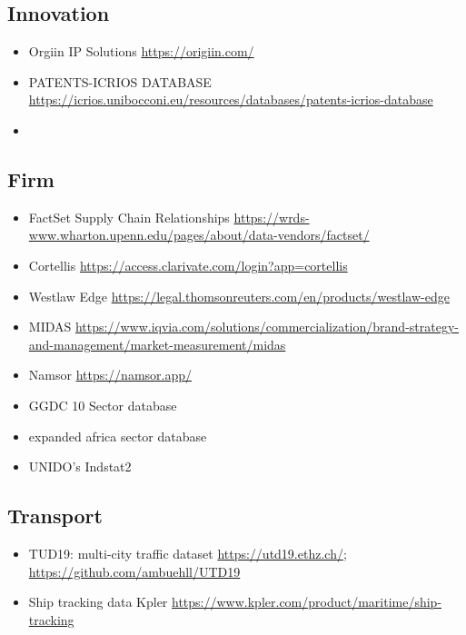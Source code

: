 \documentclass[10pt]{article} %
\begin{document}
    \subsection{Innovation}
        \begin{itemize}
            \item Orgiin IP Solutions \url{https://origiin.com/}
            \item PATENTS-ICRIOS DATABASE \url{https://icrios.unibocconi.eu/resources/databases/patents-icrios-database}
            \item 
        \end{itemize}
    
    \subsection{Firm}
        \begin{itemize}
            \item FactSet Supply Chain Relationships \url{https://wrds-www.wharton.upenn.edu/pages/about/data-vendors/factset/}
            \item Cortellis \url{https://access.clarivate.com/login?app=cortellis}
            \item Westlaw Edge \url{https://legal.thomsonreuters.com/en/products/westlaw-edge}
            \item MIDAS \url{https://www.iqvia.com/solutions/commercialization/brand-strategy-and-management/market-measurement/midas}
            \item Namsor \url{https://namsor.app/}
            \item GGDC 10 Sector database
            \item expanded africa sector database
            \item UNIDO's Indstat2
        \end{itemize}
    
    \subsection{Transport}
        \begin{itemize}
            \item TUD19: multi-city traffic dataset \url{https://utd19.ethz.ch/}; \url{https://github.com/ambuehll/UTD19}
            \item Ship tracking data Kpler \url{https://www.kpler.com/product/maritime/ship-tracking}
        \end{itemize}
\end{document}
